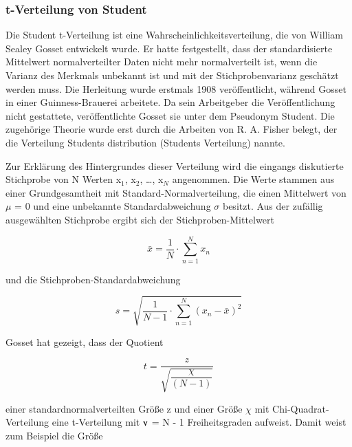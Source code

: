 \subsubsection{t-Verteilung von Student}

\noindent Die Student t-Verteilung ist eine Wahrscheinlichkeitsverteilung, die von William Sealey Gosset entwickelt wurde. Er hatte festgestellt, dass der standardisierte Mittelwert normalverteilter Daten nicht mehr normalverteilt ist, wenn die Varianz des Merkmals unbekannt ist und mit der Stichprobenvarianz gesch\"{a}tzt werden muss. Die Herleitung wurde erstmals 1908 ver\"{o}ffentlicht, w\"{a}hrend Gosset in einer Guinness-Brauerei arbeitete. Da sein Arbeitgeber die Ver\"{o}ffentlichung nicht gestattete, ver\"{o}ffentlichte Gosset sie unter dem Pseudonym Student. Die zugeh\"{o}rige Theorie wurde erst durch die Arbeiten von R. A. Fisher belegt, der die Verteilung Students distribution (Students Verteilung) nannte.\newline

\noindent Zur Erkl\"{a}rung des Hintergrundes dieser Verteilung wird die eingangs diskutierte Stichprobe von N Werten x$_{1}$, x$_{2}$, {\dots}, x$_{N}$ angenommen. Die Werte stammen aus einer Grundgesamtheit mit Standard-Normalverteilung, die einen Mittelwert von $\mu$ = 0 und eine unbekannte Standardabweichung $\sigma$ besitzt. Aus der zuf\"{a}llig ausgew\"{a}hlten Stichprobe ergibt sich der Stichproben-Mittelwert 

\begin{equation}\label{eq:fourtwohundredthirtyeight}
\bar{x}=\dfrac{1}{N} \cdot \sum _{n=1}^{N}x_{n}
\end{equation}

\noindent und die Stichproben-Standardabweichung

\begin{equation}\label{eq:fourtwohundredthirtynine}
s=\sqrt{\dfrac{1}{N-1} \cdot \sum _{n=1}^{N}\left(x_{n} -\bar{x}\right)^{2}} 
\end{equation}

\noindent Gosset hat gezeigt, dass der Quotient 

\begin{equation}\label{eq:fourtwohundredfourty}
t=\dfrac{z}{\sqrt{\dfrac{\chi }{(N-1)}}} 
\end{equation}

\noindent einer standardnormalverteilten Gr\"{o}{\ss}e z und einer Gr\"{o}{\ss}e $\chi$ mit Chi-Quadrat-Verteilung eine t-Verteilung mit $\nuup$ = N - 1 Freiheitsgraden aufweist. Damit weist zum Beispiel die Gr\"{o}{\ss}e

